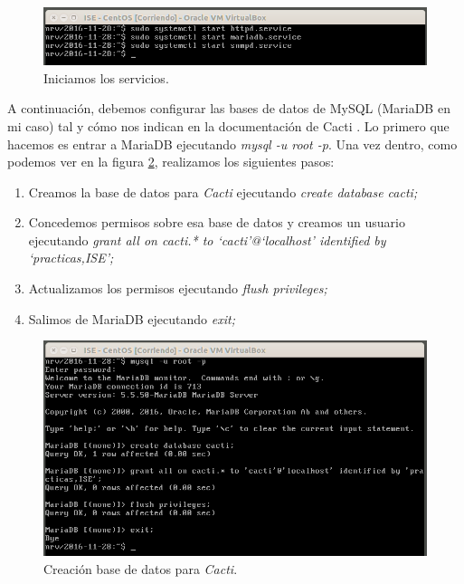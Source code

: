 \documentclass[a4paper,titlepage,12pt]{scrartcl}	%
\numberwithin{figure}{section} %
\numberwithin{table}{section} %
\begin{document}
	\begin{figure}[H]
		\includegraphics[width=\linewidth]{./Imagenes/O5-1.png}
		\vspace{-0.5cm}
		\caption[Iniciamos los servicios.]{Iniciamos los servicios.}
		\label{O5-1}
	\end{figure}
	
	A continuación, debemos configurar las bases de datos de MySQL (MariaDB en mi caso) tal y cómo nos indican en la documentación de Cacti \cite{cacti_mysql}. Lo primero que hacemos es entrar a MariaDB ejecutando \textit{mysql -u root -p}. Una vez dentro, como podemos ver en la figura \ref{O5-2}, realizamos los siguientes pasos:
	\begin{enumerate}
		\item Creamos la base de datos para \textit{Cacti} ejecutando \textit{create database cacti;}
		\item Concedemos permisos sobre esa base de datos y creamos un usuario ejecutando \textit{grant all on cacti.* to `cacti'@`localhost' identified by `practicas,ISE';}
		\item Actualizamos los permisos ejecutando \textit{flush privileges;}
		\item Salimos de MariaDB ejecutando \textit{exit;}
	\end{enumerate}
	
	\begin{figure}[H]
		\includegraphics[width=\linewidth]{./Imagenes/O5-2.png}
		\vspace{-0.5cm}
		\caption[Creación base de datos para \textit{Cacti}.]{Creación base de datos para \textit{Cacti}.}
		\label{O5-2}
	\end{figure}
	
\end{document}
